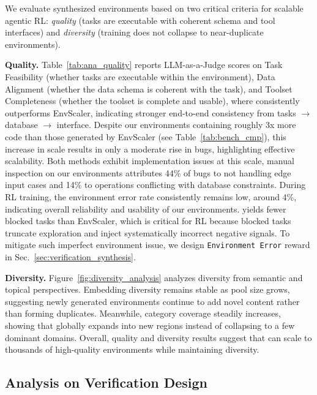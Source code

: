 \documentclass{article}
\theoremstyle{plain}
\theoremstyle{definition}
\theoremstyle{remark}
\newcommand{\synth}{\textls{\textsc{AWM}}\xspace}
\newcommand{\myparagraph}[1]{\noindent\textbf{#1}}
\begin{document}
We evaluate synthesized environments based on two critical criteria for scalable agentic RL: \emph{quality} (tasks are executable with coherent schema and tool interfaces) and \emph{diversity} (training does not collapse to near-duplicate environments). 

\myparagraph{Quality.}
Table~\ref{tab:ana_quality} reports LLM-as-a-Judge scores on Task Feasibility (whether tasks are executable within the environment), Data Alignment (whether the data schema is coherent with the task), and Toolset Completeness (whether the toolset is complete and usable), where \synth consistently outperforms EnvScaler, indicating stronger end-to-end consistency from tasks $\rightarrow$ database $\rightarrow$ interface. 
Despite our environments containing roughly 3x more code than those generated by EnvScaler (see Table~\ref{tab:bench_cmp}), this increase in scale results in only a moderate rise in bugs, highlighting effective scalability.
Both methods exhibit implementation issues at this scale, manual inspection on our environments attributes 44\% of bugs to not handling edge input cases and 14\% to operations conflicting with database constraints. During RL training, the environment error rate consistently remains low, around 4\%, indicating overall reliability and usability of our environments.
\synth yields fewer blocked tasks than EnvScaler, which is critical for RL because blocked tasks truncate exploration and inject systematically incorrect negative signals. 
To mitigate such imperfect environment issue, we design \texttt{Environment Error} reward in Sec.~\ref{sec:verification_synthesis}. 

\myparagraph{Diversity.}
Figure~\ref{fig:diversity_analysis} analyzes diversity from semantic and topical perspectives. Embedding diversity remains stable as pool size grows, suggesting newly generated environments continue to add novel content rather than forming duplicates. 
Meanwhile, category coverage steadily increases, showing that \synth globally expands into new regions instead of collapsing to a few dominant domains.
Overall, quality and diversity results suggest that \synth can scale to thousands of high-quality environments while maintaining diversity.


\subsection{Analysis on Verification Design} \label{sec:ablation_verification}


\end{document}

